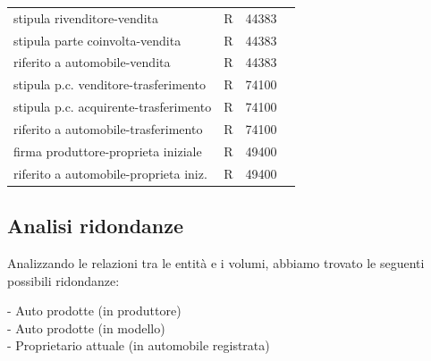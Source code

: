 \documentclass{report} %
\begin{document}
\begin{table}[h!]
\begin{tabular}{|l|l|l|l|}
stipula rivenditore-vendita & R & 44383	& \\					
stipula parte coinvolta-vendita & R	& 44383 & \\						
riferito a automobile-vendita & R & 44383 & \\					
stipula p.c. venditore-trasferimento &R	& 74100 & \\					
stipula p.c. acquirente-trasferimento & R & 74100 & \\					
riferito a automobile-trasferimento & R	& 74100	& \\					
firma produttore-proprieta iniziale & R & 49400	& \\					
riferito a automobile-proprieta iniz. & R & 49400 & \\
\hline
\end{tabular}
\end{table}

\subsection{Analisi ridondanze}
Analizzando le relazioni tra le entità e i volumi, abbiamo trovato le seguenti possibili ridondanze:

 - Auto prodotte (in produttore) \\
 
 - Auto prodotte (in modello) \\
 
 - Proprietario attuale (in automobile registrata) \\
\end{document}
